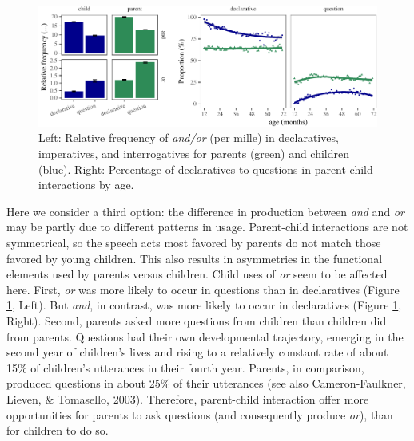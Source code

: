 \documentclass[
  english,
  ,man,floatsintext]{apa6}
\begin{document}
\begin{figure}[tb]

{\centering \includegraphics{figs/speechActPlots-1} 

}

\caption{Left: Relative frequency of \textit{and/or} (per mille) in declaratives, imperatives, and interrogatives for parents (green) and children (blue). Right: Percentage of declaratives to questions in parent-child interactions by age.}\label{fig:speechActPlots}
\end{figure}

Here we consider a third option: the difference in production between \emph{and} and \emph{or} may be partly due to different patterns in usage. Parent-child interactions are not symmetrical, so the speech acts most favored by parents do not match those favored by young children. This also results in asymmetries in the functional elements used by parents versus children. Child uses of \emph{or} seem to be affected here. First, \emph{or} was more likely to occur in questions than in declaratives (Figure \ref{fig:speechActPlots}, Left). But \emph{and}, in contrast, was more likely to occur in declaratives (Figure \ref{fig:speechActPlots}, Right). Second, parents asked more questions from children than children did from parents. Questions had their own developmental trajectory, emerging in the second year of children's lives and rising to a relatively constant rate of about 15\% of children's utterances in their fourth year. Parents, in comparison, produced questions in about 25\% of their utterances (see also Cameron-Faulkner, Lieven, \& Tomasello, 2003). Therefore, parent-child interaction offer more opportunities for parents to ask questions (and consequently produce \emph{or}), than for children to do so.
\end{document}
